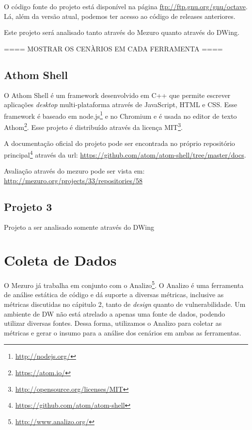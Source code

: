 O código fonte do projeto está disponível na página \url{ftp://ftp.gnu.org/gnu/octave}. Lá, além da versão atual, podemos ter acesso ao código de releases anteriores.

Este projeto será analisado tanto através do Mezuro quanto através do DWing.


==== MOSTRAR OS CENÀRIOS EM CADA FERRAMENTA ====


\subsection{Athom Shell}
\label{section-athom}

O Athom Shell é um framework desenvolvido em C++ que permite escrever aplicações \emph{desktop} multi-plataforma através de JavaScript, HTML e CSS. Esse framework é baseado em node.js\footnote{\url{http://nodejs.org/}} e no Chromium e é usada no editor de texto Athom\footnote{\url{https://atom.io/}}. Esse projeto é distribuído através da licença MIT\footnote{\url{http://opensource.org/licenses/MIT}}.

A documentação oficial do projeto pode ser encontrada no próprio repositório principal\footnote{\url{https://github.com/atom/atom-shell}} através da url: \url{https://github.com/atom/atom-shell/tree/master/docs}.

Avaliação através do mezuro pode ser vista em: \url{http://mezuro.org/projects/33/repositories/58}

\subsection{Projeto 3}
\label{}

Projeto a ser analisado somente através do DWing


\section{Coleta de Dados}
\label{data-colect}

O Mezuro já trabalha em conjunto com o Analizo\footnote{\url{http://www.analizo.org/}}. O Analizo é uma ferramenta de análise estática de código e dá suporte a diversas métricas, inclusive as métricas discutidas no cápitulo 2, tanto de \emph{design} quanto de vulnerabilidade. Um ambiente de DW não está atrelado a apenas uma fonte de dados, podendo utilizar diversas fontes. Dessa forma, utilizamos o Analizo para coletar as métricas e gerar o insumo para a análise dos cenários em ambas as ferramentas.


